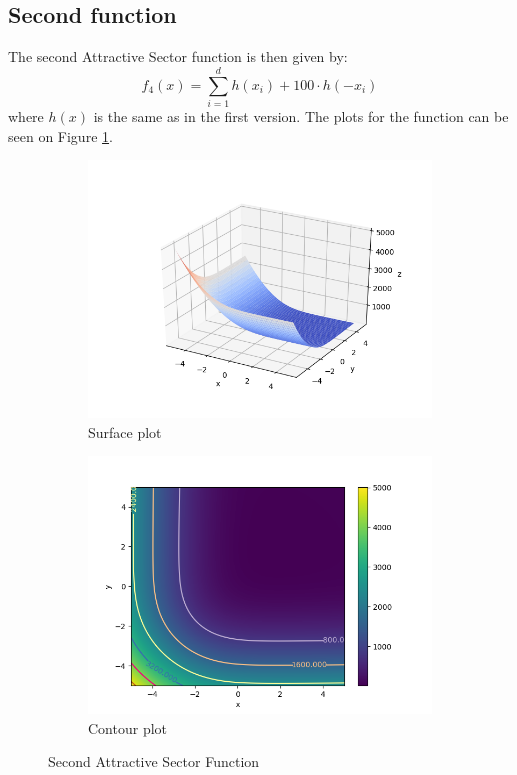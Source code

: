 \documentclass[a4paper]{article}
\begin{document}
\subsection{Second function}
The second Attractive Sector function is then given by:
\[
f_{4}(x)=\sum_{i=1}^{d} h\left(x_{i}\right)+100 \cdot h\left(-x_{i}\right)
\]
where $h(x)$ is the same as in the first version.
The plots for the function can be seen on Figure \ref{plt5}.
\begin{figure}[H]
  \centering
  \begin{subfigure}[b]{0.49\textwidth}
    \centering
    \includegraphics[width=\textwidth]{imgs/plt51}
    \caption{Surface plot}
  \end{subfigure}
  \begin{subfigure}[b]{0.49\textwidth}
    \centering
    \includegraphics[width=\textwidth]{imgs/plt52}
    \caption{Contour plot}
  \end{subfigure}
  \caption{Second Attractive Sector Function}
  \label{plt5}
\end{figure}
\end{document}
